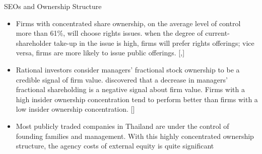\documentclass{beamer}
\begin{document}
	\begin{frame}{SEOs and Ownership Structure}
		\begin{itemize}\scriptsize
			
			\item  Firms with concentrated share ownership, on the
			average level of control more than 61\%, will choose rights issues. when the degree of current-shareholder take-up in the issue is high,
			firms will prefer rights offerings; vice versa, firms are more likely to issue public
			offerings. [\cite{hansen1982direct},\cite{eckbo1992adverse}]
			\item Rational investors consider managers’ fractional
			stock ownership to be a credible signal of firm value. 
			\cite{leland1977informational}  discovered
			that a decrease in managers’ fractional shareholding is a negative signal about firm
			value. Firms with a high insider ownership concentration
			tend to perform better than firms with a low insider ownership concentration. [\cite{limpaphayom2004ownership}]
			\item Most publicly traded companies in Thailand are under the control of founding families
			and management. With this highly concentrated ownership structure, the agency costs
			of external equity is quite significant
		\end{itemize}
	\end{frame}
	
\end{document}
